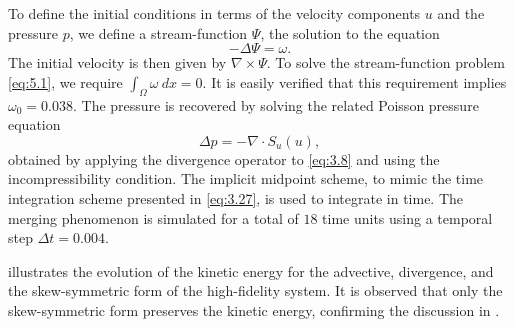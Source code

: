 To define the initial conditions in terms of the velocity components $u$ and the pressure $p$, we define a stream-function $\Psi$, the solution to the equation 
\begin{equation} \label{eq:5.1}
	- \Delta \Psi = \omega.
\end{equation}
The initial velocity is then given by $\nabla \times \Psi$. To solve the stream-function problem \eqref{eq:5.1}, we require $\int_{\Omega} \omega \ dx= 0$. It is easily verified that this requirement implies $\omega_0 = 0.038$. The pressure is recovered by solving the related Poisson pressure equation 
\begin{equation*}
\Delta p = - \nabla \cdot S_{u}(u),
\end{equation*}
obtained by applying the divergence operator to \eqref{eq:3.8} and using the incompressibility condition.
 The implicit midpoint scheme, to mimic the time integration scheme presented in \eqref{eq:3.27}, is used to integrate in time. The merging phenomenon is simulated for a total of $18$ time units using a temporal step $\Delta t=0.004$.

 illustrates the evolution of the kinetic energy for the advective, divergence, and the skew-symmetric form of the high-fidelity system. It is observed that only the skew-symmetric form preserves the kinetic energy, confirming the discussion in .

